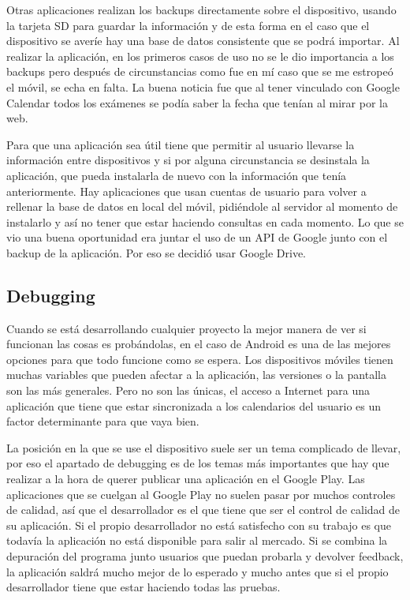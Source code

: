 Otras aplicaciones realizan los backups directamente sobre el dispositivo, usando la tarjeta SD para guardar la información y de esta forma en el caso que el dispositivo se averíe hay una base de datos consistente que se podrá importar.
Al realizar la aplicación, en los primeros casos de uso no se le dio importancia a los backups pero después de circunstancias como fue en mí caso que se me estropeó el móvil, se echa en falta. La buena noticia fue que al tener vinculado con Google Calendar todos los exámenes se podía saber la fecha que tenían al mirar por la web.

Para que una aplicación sea útil tiene que permitir al usuario llevarse la información entre dispositivos y si por alguna circunstancia se desinstala la aplicación, que pueda instalarla de nuevo con la información que tenía anteriormente.
Hay aplicaciones que usan cuentas de usuario para volver a rellenar la base de datos en local del móvil, pidiéndole al servidor al momento de instalarlo y así no tener que estar haciendo consultas en cada momento.
Lo que se vio una buena oportunidad era juntar el uso de un API de Google junto con el backup de la aplicación. Por eso se decidió usar Google Drive.

\subsection{Debugging}
\label{subsecc:Debugging}

Cuando se está desarrollando cualquier proyecto la mejor manera de ver si funcionan las cosas es probándolas, en el caso de Android es una de las mejores opciones para que todo funcione como se espera.
Los dispositivos móviles tienen muchas variables que pueden afectar a la aplicación, las versiones o la pantalla son las más generales. Pero no son las únicas, el acceso a Internet para una aplicación que tiene que estar sincronizada a los calendarios del usuario es un factor determinante para que vaya bien.

La posición en la que se use el dispositivo suele ser un tema complicado de llevar, por eso el apartado de debugging es de los temas más importantes que hay que realizar a la hora de querer publicar una aplicación en el Google Play.
Las aplicaciones que se cuelgan al Google Play no suelen pasar por muchos controles de calidad, así que el desarrollador es el que tiene que ser el control de calidad de su aplicación. Si el propio desarrollador no está satisfecho con su trabajo es que todavía la aplicación no está disponible para salir al mercado.
Si se combina la depuración del programa junto usuarios que puedan probarla y devolver feedback, la aplicación saldrá mucho mejor de lo esperado y mucho antes que si el propio desarrollador tiene que estar haciendo todas las pruebas.

